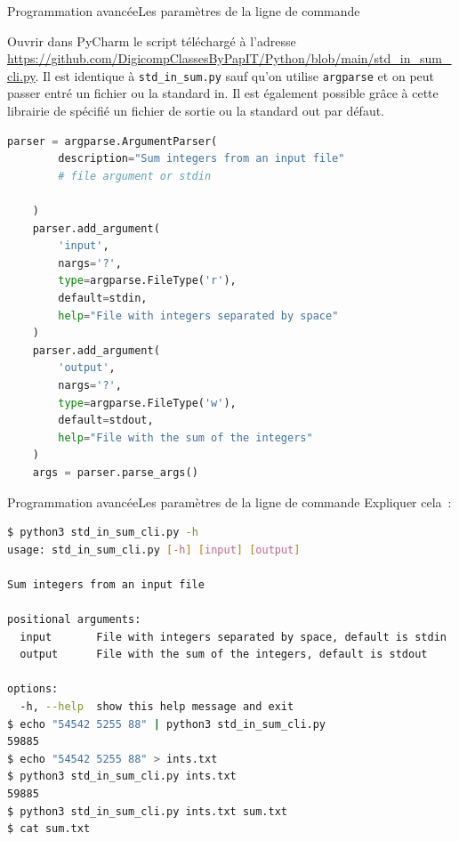\documentclass{beamer}
\begin{document}
    \begin{frame}[fragile]{Programmation avancée}{Les paramètres de la ligne de commande}
        \begin{footnotesize}
            Ouvrir dans PyCharm le script téléchargé à l'adresse \url{https://github.com/DigicompClassesByPapIT/Python/blob/main/std_in_sum_cli.py}.
            Il est identique à \lstinline{std_in_sum.py} sauf qu'on utilise \lstinline{argparse} et on peut passer entré un fichier ou la standard in.
            Il est également possible grâce à cette librairie de spécifié un fichier de sortie ou la standard out par défaut.
        \end{footnotesize}
        \begin{lstlisting}[language=Python,basicstyle=\tiny\ttfamily]
    parser = argparse.ArgumentParser(
        description="Sum integers from an input file"
        # file argument or stdin

    )
    parser.add_argument(
        'input',
        nargs='?',
        type=argparse.FileType('r'),
        default=stdin,
        help="File with integers separated by space"
    )
    parser.add_argument(
        'output',
        nargs='?',
        type=argparse.FileType('w'),
        default=stdout,
        help="File with the sum of the integers"
    )
    args = parser.parse_args()
        \end{lstlisting}
    \end{frame}

    \begin{frame}[fragile]{Programmation avancée}{Les paramètres de la ligne de commande}
        Expliquer cela~:
        \begin{lstlisting}[language=Bash]
$ python3 std_in_sum_cli.py -h
usage: std_in_sum_cli.py [-h] [input] [output]

Sum integers from an input file

positional arguments:
  input       File with integers separated by space, default is stdin
  output      File with the sum of the integers, default is stdout

options:
  -h, --help  show this help message and exit
$ echo "54542 5255 88" | python3 std_in_sum_cli.py
59885
$ echo "54542 5255 88" > ints.txt
$ python3 std_in_sum_cli.py ints.txt
59885
$ python3 std_in_sum_cli.py ints.txt sum.txt
$ cat sum.txt
        \end{lstlisting}
    \end{frame}
\end{document}
